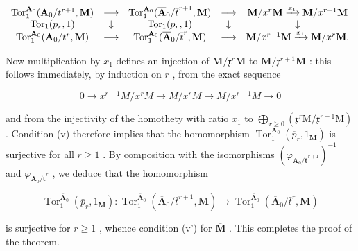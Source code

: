 \[
\begin{array}{c c c c c} \operatorname{Tor} _ {1} ^ {\mathbf {A} _ {0}} (\mathbf {A} _ {0} / t ^ {r + 1}, \mathbf {M}) & \longrightarrow & \operatorname{Tor} _ {1} ^ {\mathbf {A} _ {0}} (\overline {{\mathbf {A}}} _ {0} / \overline {{t}} ^ {r + 1}, \mathbf {M}) & \longrightarrow & \mathbf {M} / x ^ {r}   \mathbf {M} \xrightarrow {x _ {1}} \mathbf {M} / x ^ {r + 1}   \mathbf {M} \\ \operatorname{Tor} _ {1} (p _ {r}, 1) & \downarrow & \operatorname{Tor} _ {1} (\bar {p} _ {r}, 1) & \downarrow & \downarrow \\ \operatorname{Tor} _ {1} ^ {\mathbf {A} _ {0}} (\mathbf {A} _ {0} / t ^ {r}, \mathbf {M}) & \longrightarrow & \operatorname{Tor} _ {1} ^ {\mathbf {A} _ {0}} (\overline {{\mathbf {A}}} _ {0} / \overline {{t}} ^ {r}, \mathbf {M}) & \longrightarrow & \mathbf {M} / x ^ {r - 1}   \mathbf {M} \xrightarrow {x _ {1}} \mathbf {M} / x ^ {r}   \mathbf {M}. \end{array}
\]

Now multiplication by \(x_{1}\) defines an injection of \(\mathbf{M}/\mathfrak{x}^{r}\mathbf{M}\) to \(\mathbf{M}/\mathfrak{x}^{r+1}\mathbf{M}\) : this follows immediately, by induction on \(r\) , from the exact sequence

\[
0 \rightarrow x ^ {r - 1} M / x ^ {r} M \rightarrow M / x ^ {r} M \rightarrow M / x ^ {r - 1} M \rightarrow 0
\]

and from the injectivity of the homothety with ratio \(x_{1}\) to \(\bigoplus_{r\geqslant 0}(\mathfrak{x}^{r}\mathrm{M}/\mathfrak{x}^{r+1}\mathrm{M})\) . Condition (v) therefore implies that the homomorphism \(\operatorname{Tor}_{1}^{\mathbf{A}_{0}}(\overline{p}_{r},1_{\mathbf{M}})\) is surjective for all \(r\geqslant 1\) . By composition with the isomorphisms \((\varphi_{\overline{\mathbf{A}}_{0}/\overline{\mathbf{t}}^{r+1}})^{-1}\) and \(\varphi_{\overline{\mathbf{A}}_{0}/\overline{\mathbf{t}}^{r}}\) , we deduce that the homomorphism

\[
\operatorname{Tor} _ {1} ^ {\overline {{\mathbf {A}}} _ {0}} \left(\bar {p} _ {r}, 1 _ {\mathbf {M}}\right): \operatorname{Tor} _ {1} ^ {\overline {{\mathbf {A}}} _ {0}} \left(\overline {{\mathbf {A}}} _ {0} / \bar {t} ^ {r + 1}, \mathbf {M}\right)\rightarrow \operatorname{Tor} _ {1} ^ {\overline {{\mathbf {A}}} _ {0}} \left(\overline {{\mathbf {A}}} _ {0} / \bar {t} ^ {r}, \mathbf {M}\right)
\]

is surjective for \(r \geqslant 1\) , whence condition (v') for \(\overline{\mathbf{M}}\) . This completes the proof of the theorem.


